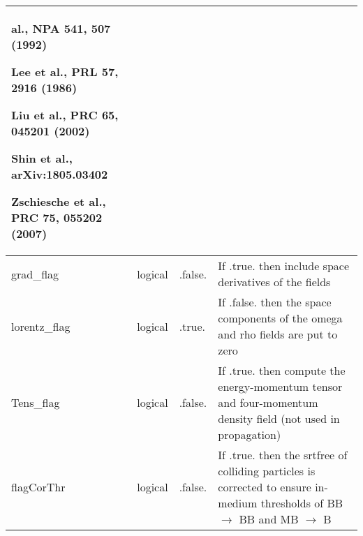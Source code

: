 \documentclass{article}
\begin{document}
\begin{longtable}{llll}
al., NPA 541, 507 (1992)\item Lee et al., PRL 57, 2916 (1986)\item Liu et al., PRC 65, 045201 (2002)\item Shin et al., arXiv:1805.03402\item Zschiesche et al., PRC 75, 055202 (2007)\end{itemize}\end{minipage}\\*
\midrule
grad\_flag & \begin{minipage}[t]{2cm}logical\end{minipage} & \begin{minipage}[t]{2cm}.false.\end{minipage} & \begin{minipage}[t]{12cm}If .true. then include space derivatives of the fields\end{minipage}\\*
\midrule
lorentz\_flag & \begin{minipage}[t]{2cm}logical\end{minipage} & \begin{minipage}[t]{2cm}.true.\end{minipage} & \begin{minipage}[t]{12cm}If .false. then the space components of the omega and rho fields are put to zero\end{minipage}\\*
\midrule
Tens\_flag & \begin{minipage}[t]{2cm}logical\end{minipage} & \begin{minipage}[t]{2cm}.false.\end{minipage} & \begin{minipage}[t]{12cm}If .true. then compute the energy-momentum tensor and four-momentum density field (not used in propagation)\end{minipage}\\*
\midrule
flagCorThr & \begin{minipage}[t]{2cm}logical\end{minipage} & \begin{minipage}[t]{2cm}.false.\end{minipage} & \begin{minipage}[t]{12cm}If .true. then the srtfree of colliding particles is corrected to ensure in-medium thresholds of BB $\rightarrow$ BB and MB $\rightarrow$ B\end{minipage}\\*

\end{longtable}
\end{document}
